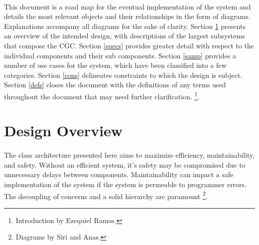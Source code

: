 \documentclass[12pt]{article}
\begin{document}
\paragraph{} This document is a road map for the eventual implementation of the system and details the most 
relevant objects and their relationships in the form of diagrams. Explanations accompany all diagrams for the sake of clarity.
Section \ref{over} presents an overview of the intended design, with descriptions of the largest subsystems that compose the CGC. 
Section \ref{specs} provides greater detail with respect to the individual components and their sub components. Section \ref{samp} 
provides a number of use cases for the system, which have been classified into a few categories. Section \ref{cons} delineates 
constraints to which the design is subject. Section \ref{defs} closes the document with the definitions of any terms used 
throughout the document that may need further clarification. 
\footnote{Introduction by Ezequiel Ramos.}.

\section{Design Overview} \label{over}
\paragraph{} The class architecture presented here aims to maximize efficiency, maintainability, and 
safety. Without an efficient system, it's safety may be compromised due to unnecessary 
delays between components. Maintainability can impact a safe implementation of the 
system if the system is permeable to programmer errors. The decoupling of concerns and 
a solid hierarchy are paramount \footnote{Diagrams by Siri and Anas.}.
\end{document}
